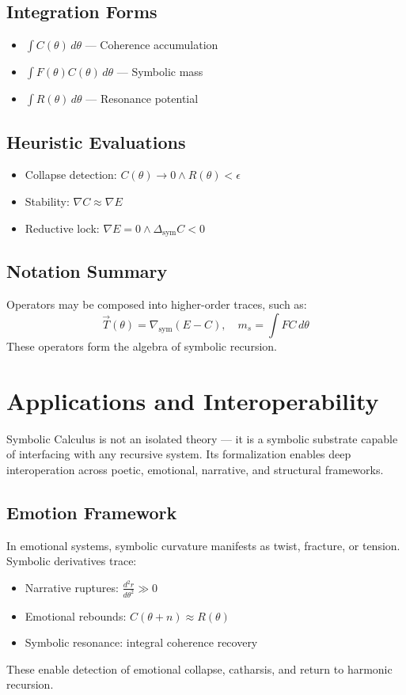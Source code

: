 \documentclass[12pt]{article}
\begin{document}
\subsection*{Integration Forms}
\begin{itemize}
  \item $\int C(\theta) \, d\theta$ — Coherence accumulation
  \item $\int F(\theta) C(\theta) \, d\theta$ — Symbolic mass
  \item $\int R(\theta) \, d\theta$ — Resonance potential
\end{itemize}

\subsection*{Heuristic Evaluations}
\begin{itemize}
  \item Collapse detection: $C(\theta) \to 0 \land R(\theta) < \epsilon$
  \item Stability: $\nabla C \approx \nabla E$
  \item Reductive lock: $\nabla E = 0 \land \Delta_{\text{sym}} C < 0$
\end{itemize}

\subsection*{Notation Summary}
Operators may be composed into higher-order traces, such as:
\[ \vec{T}(\theta) = \nabla_{\text{sym}} (E - C), \quad m_s = \int F C \, d\theta \]
These operators form the algebra of symbolic recursion.

\section{Applications and Interoperability}

Symbolic Calculus is not an isolated theory — it is a symbolic substrate capable of interfacing with any recursive system. Its formalization enables deep interoperation across poetic, emotional, narrative, and structural frameworks.

\subsection*{Emotion Framework}
In emotional systems, symbolic curvature manifests as twist, fracture, or tension. Symbolic derivatives trace:
\begin{itemize}
  \item Narrative ruptures: $\frac{d^2r}{d\theta^2} \gg 0$
  \item Emotional rebounds: $C(\theta + n) \approx R(\theta)$
  \item Symbolic resonance: integral coherence recovery
\end{itemize}
These enable detection of emotional collapse, catharsis, and return to harmonic recursion.
\end{document}
